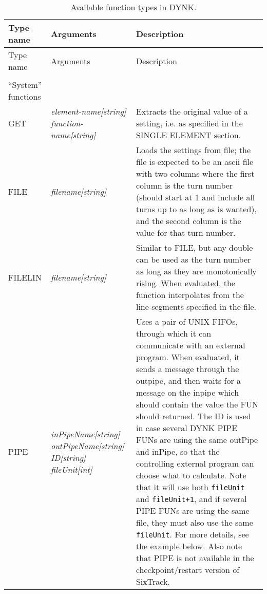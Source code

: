 \documentclass[a4paper,11pt]{report}
\begin{document}
\pagebreak
\begin{center}
\begin{longtable}{|p{2.25cm} | p{4cm} p{9.5cm}|}
  \caption{Available function types in DYNK.}
  \label{tab:DYNK_FUN} \\*
  \hline
  \rowcolor{blue!30}
  Type name & Arguments & Description \\*
  \hline
  \endfirsthead

  \hline
  \rowcolor{blue!30}
  Type name & Arguments & Description \\*
  \endhead

  \rowcolor{gray!15}
  \multicolumn{3}{|c|}{(The table continues on the next page)}\\*
  \hline
  \endfoot
  
  \hline
  \endlastfoot

  \rowcolor{blue!15}
  ``System'' functions & & \\*

  GET        & \emph{element-name[string] function-name[string]} & 
  Extracts the original value of a setting, i.e. as specified in the SINGLE ELEMENT section. \\*

  FILE       & \emph{filename[string]} &
  Loads the settings from file; the file is expected to be an ascii file with two columns where the first column is the turn number (should start at 1 and include all turns up to as long as is wanted), and the second column is the value for that turn number.\\*
  
  FILELIN    & \emph{filename[string]} &
  Similar to FILE, but any double can be used as the turn number as long as they are monotonically rising.
  When evaluated, the function interpolates from the line-segments specified in the file. \\*
  
  PIPE       & \emph{inPipeName[string] outPipeName[string] ID[string] fileUnit[int]} &
  Uses a pair of UNIX FIFOs, through which it can communicate with an external program.
  When evaluated, it sends a message through the outpipe, and then waits for a message on the inpipe which should contain the value the FUN should returned.
  The ID is used in case several DYNK PIPE FUNs are using the same outPipe and inPipe, so that the controlling external program can choose what to calculate.
  Note that it will use both \texttt{fileUnit} and \texttt{fileUnit+1}, and if several PIPE FUNs are using the same file, they must also use the same \texttt{fileUnit}.
  For more details, see the example below.
  Also note that PIPE is not available in the checkpoint/restart version of SixTrack.\\*
  

\end{longtable}
\end{center}
\end{document}
